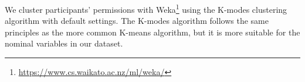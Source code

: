 We cluster participants' permissions with Weka\footnote{\url{https://www.cs.waikato.ac.nz/ml/weka/}} using the K-modes clustering algorithm with default settings. The K-modes algorithm follows the same principles as the more common K-means algorithm, but it is more suitable for the nominal variables in our dataset.


